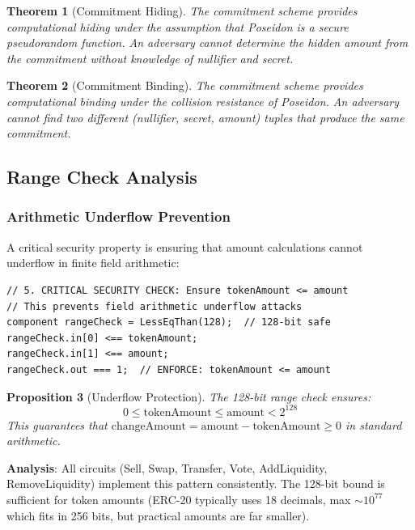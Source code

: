 \documentclass[11pt,a4paper]{article}
\newtheorem{theorem}{Theorem}[section]
\newtheorem{proposition}[theorem]{Proposition}
\begin{document}
\begin{theorem}[Commitment Hiding]
The commitment scheme provides computational hiding under the assumption that Poseidon is a secure pseudorandom function. An adversary cannot determine the hidden amount from the commitment without knowledge of nullifier and secret.
\end{theorem}

\begin{theorem}[Commitment Binding]
The commitment scheme provides computational binding under the collision resistance of Poseidon. An adversary cannot find two different (nullifier, secret, amount) tuples that produce the same commitment.
\end{theorem}

\subsection{Range Check Analysis}

\subsubsection{Arithmetic Underflow Prevention}

A critical security property is ensuring that amount calculations cannot underflow in finite field arithmetic:

\begin{lstlisting}[style=circom, caption={Range Check in Sell Circuit (sell.circom:79-85)}]
// 5. CRITICAL SECURITY CHECK: Ensure tokenAmount <= amount
// This prevents field arithmetic underflow attacks
component rangeCheck = LessEqThan(128);  // 128-bit safe
rangeCheck.in[0] <== tokenAmount;
rangeCheck.in[1] <== amount;
rangeCheck.out === 1;  // ENFORCE: tokenAmount <= amount
\end{lstlisting}

\begin{proposition}[Underflow Protection]
The 128-bit range check ensures:
\begin{equation}
0 \leq \text{tokenAmount} \leq \text{amount} < 2^{128}
\end{equation}
This guarantees that $\text{changeAmount} = \text{amount} - \text{tokenAmount} \geq 0$ in standard arithmetic.
\end{proposition}

\textbf{Analysis}: All circuits (Sell, Swap, Transfer, Vote, AddLiquidity, RemoveLiquidity) implement this pattern consistently. The 128-bit bound is sufficient for token amounts (ERC-20 typically uses 18 decimals, max $\sim10^{77}$ which fits in 256 bits, but practical amounts are far smaller).
\end{document}
